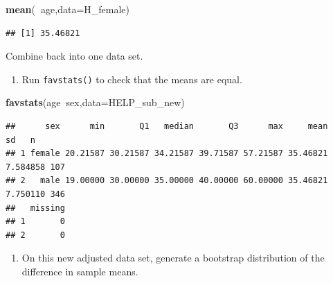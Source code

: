 \documentclass[
]{book}
\newenvironment{Shaded}{\begin{snugshade}}{\end{snugshade}}
\newcommand{\DataTypeTok}[1]{\textcolor[rgb]{0.13,0.29,0.53}{#1}}
\newcommand{\KeywordTok}[1]{\textcolor[rgb]{0.13,0.29,0.53}{\textbf{#1}}}
\newcommand{\NormalTok}[1]{#1}
\newcommand{\OperatorTok}[1]{\textcolor[rgb]{0.81,0.36,0.00}{\textbf{#1}}}
\newcommand{\StringTok}[1]{\textcolor[rgb]{0.31,0.60,0.02}{#1}}
\providecommand{\tightlist}{%
  \setlength{\itemsep}{0pt}\setlength{\parskip}{0pt}}
\begin{document}
\begin{Shaded}
\begin{Highlighting}[]
\KeywordTok{mean}\NormalTok{(}\OperatorTok{~}\NormalTok{age,}\DataTypeTok{data=}\NormalTok{H_female)}
\end{Highlighting}
\end{Shaded}

\begin{verbatim}
## [1] 35.46821
\end{verbatim}

Combine back into one data set.

\begin{Shaded}
\end{Shaded}

\begin{enumerate}
\def\labelenumi{\alph{enumi}.}
\setcounter{enumi}{2}
\tightlist
\item
  Run \texttt{favstats()} to check that the means are equal.
\end{enumerate}

\begin{Shaded}
\begin{Highlighting}[]
\KeywordTok{favstats}\NormalTok{(age}\OperatorTok{~}\NormalTok{sex,}\DataTypeTok{data=}\NormalTok{HELP_sub_new)}
\end{Highlighting}
\end{Shaded}

\begin{verbatim}
##      sex      min       Q1   median       Q3      max     mean       sd   n
## 1 female 20.21587 30.21587 34.21587 39.71587 57.21587 35.46821 7.584858 107
## 2   male 19.00000 30.00000 35.00000 40.00000 60.00000 35.46821 7.750110 346
##   missing
## 1       0
## 2       0
\end{verbatim}

\begin{enumerate}
\def\labelenumi{\alph{enumi}.}
\setcounter{enumi}{3}
\tightlist
\item
  On this new adjusted data set, generate a bootstrap distribution of the difference in sample means.
\end{enumerate}
\end{document}
